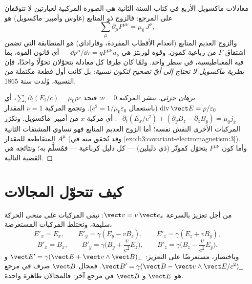 \begin{theorem}\label{thm:b3:covariant-electromagnetism:maxwell}
معادلات ماكسويل الأربع في كتاب السنة الثانية هي الصورة
المركبية لعبارتين لا تتوقفان على المرجع: فالزوج ذو المنابع
(غاوس وأمبير--ماكسويل) هو
\[
\sum_\mu \partial_\mu F^{\mu\nu} = \mu_0\,J^\nu ,
\]
والزوج العديم المنابع (انعدام الأقطاب المفردة، وفاراداي) هو المتطابقة
التي تضمن اشتقاق $F$ من رباعية كمون. وقوة لورنتز
هي $\dd p^\mu/\dd\tau = qF^{\mu\nu}u_\nu$ --- أي قانون القوة،
بما فيه المغناطيسية، في سطر واحد. ولمّا كان طرفا كل معادلة
يتحوّلان تحوّلًا واحدًا، فإن \emph{نظرية ماكسويل لا تحتاج إلى أيّ
تصحيح لتكون نسبية}: بل كانت أول قطعة مكتملة من النسبية، وُلدت
سنة 1865.
\end{theorem}

\begin{proof}[برهان جزئي]
ننشر المركبة $\nu = 0$: فنجد $\sum_i\partial_i(E_i/c) =
\mu_0\rho c$، أي $\operatorname{div}\vect E = \rho/\varepsilon_0$
(باستعمال $c^2 = 1/\mu_0\varepsilon_0$). وتجمع المركبة $\nu = 1$
المقدار $-\partial_t(E_x/c^2) + (\partial_yB_z - \partial_zB_y)
= \mu_0 j_x$: أي مركبة $x$ من أمبير--ماكسويل. وتكرّر المركبات
الأخرى النقش نفسه؛ أما الزوج العديم المنابع فهو تساوي
المشتقات الثانية المتقاطعة للمقدار $A^\mu$ (وقد تُحقق منه في
\cref{exo:b3:covariant-electromagnetism:3}). وأما كون $F^{\mu\nu}$
يتحوّل كموتّر (ذي دليلين) --- كل دليل كرباعية ---
فمُسلَّم به؛ ونتائجه هي القضية التالية.
\end{proof}

\section{كيف تتحوّل المجالات}

\begin{proposition}\label{prop:b3:covariant-electromagnetism:transform}
من أجل تعزيز بالسرعة $\vect v = v\,\vect e_x$: تبقى المركبات
\emph{على منحى} الحركة سليمة، وتختلط المركبات المستعرضة،
\[
E'_x = E_x , \qquad
E'_y = \gamma(E_y - vB_z) , \qquad
E'_z = \gamma(E_z + vB_y) ,
\]
\[
B'_x = B_x , \qquad
B'_y = \gamma\Big(B_y + \frac{v}{c^2}E_z\Big) , \qquad
B'_z = \gamma\Big(B_z - \frac{v}{c^2}E_y\Big) .
\]
وباختصار، مستعرضًا على التعزيز: $\vect E' = \gamma(\vect E +
\vect v\wedge\vect B)_\perp$ و $\vect B' = \gamma(\vect B - \vect
v\wedge\vect E/c^2)_\perp$. فمجال $\vect B$ صرف في مرجع هو $\vect
E$ و $\vect B$ في مرجع آخر: فالمجالان ظاهرة واحدة.
\end{proposition}
\admitted

